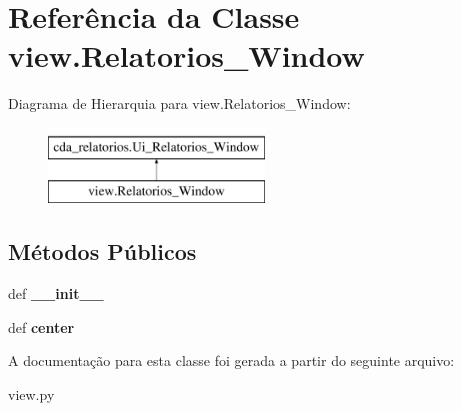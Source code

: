 \hypertarget{classview_1_1Relatorios__Window}{\section{\-Referência da \-Classe view.\-Relatorios\-\_\-\-Window}
\label{classview_1_1Relatorios__Window}
}
\-Diagrama de \-Hierarquia para view.\-Relatorios\-\_\-\-Window\-:\begin{figure}[H]
\begin{center}
\leavevmode
\includegraphics[height=2.000000cm]{classview_1_1Relatorios__Window}
\end{center}
\end{figure}
\subsection*{\-Métodos \-Públicos}
\begin{DoxyCompactItemize}
\item 
\hypertarget{classview_1_1Relatorios__Window_a54dd1df25708a86009823246a6dcdb2b}{def {\bfseries \-\_\-\-\_\-init\-\_\-\-\_\-}}\label{classview_1_1Relatorios__Window_a54dd1df25708a86009823246a6dcdb2b}

\item 
\hypertarget{classview_1_1Relatorios__Window_a31caf190d0ab28765eb08d79fe303f83}{def {\bfseries center}}\label{classview_1_1Relatorios__Window_a31caf190d0ab28765eb08d79fe303f83}

\end{DoxyCompactItemize}


\-A documentação para esta classe foi gerada a partir do seguinte arquivo\-:\begin{DoxyCompactItemize}
\item 
view.\-py\end{DoxyCompactItemize}
